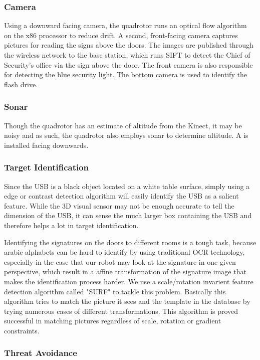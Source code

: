 \documentclass[12pt, letterpaper]{article}
\begin{document}
\subsubsection{Camera}
Using a downward facing camera, the quadrotor runs an optical flow algorithm on the x86 processor to reduce drift.  A second, front-facing camera captures pictures for reading the signs above the doors.  The images are published through the wireless network to the base station, which runs SIFT to detect the Chief of Security's office via the sign above the door. The front camera is also responsible for detecting the blue security light.  The bottom camera is used to identify the flash drive.

\subsubsection{Sonar}
Though the quadrotor has an estimate of altitude from the Kinect, it may be noisy and as such, the quadrotor also employs sonar to determine altitude.  A  is installed facing downwards.

\subsubsection{Target Identification}

Since the USB is a black object located on a white table surface, simply using a edge or contrast detection algorithm will easily identify the USB as a salient feature. While the 3D visual sensor may not be enough accurate to tell the dimension of the USB, it can sense the much larger box containing the USB and therefore helps a lot in target identification. 

Identifying the signatures on the doors to different rooms is a tough task, because arabic alphabets can be hard to identify by using traditional OCR technology, especially in the case that our robot may look at the signature in one given perspective, which result in a affine transformation of the signature image that makes the identification process harder. We use a scale/rotation invarient feature detection algorithm called "SURF" to tackle this problem. Basically this algorithm tries to match the picture it sees and the template in the database by trying numerous cases of different transformations. This algorithm is proved successful in matching pictures regardless of scale, rotation or gradient constraints.

\subsubsection{Threat Avoidance}
\end{document}

